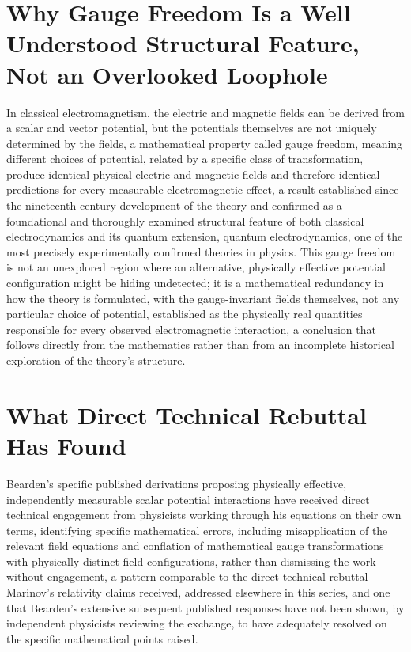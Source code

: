 \documentclass[11pt]{article}
\begin{document}
\section{Why Gauge Freedom Is a Well Understood Structural Feature, Not an Overlooked Loophole}

In classical electromagnetism, the electric and magnetic fields can be derived from a scalar and vector potential, but the potentials themselves are not uniquely determined by the fields, a mathematical property called gauge freedom, meaning different choices of potential, related by a specific class of transformation, produce identical physical electric and magnetic fields and therefore identical predictions for every measurable electromagnetic effect, a result established since the nineteenth century development of the theory and confirmed as a foundational and thoroughly examined structural feature of both classical electrodynamics and its quantum extension, quantum electrodynamics, one of the most precisely experimentally confirmed theories in physics. This gauge freedom is not an unexplored region where an alternative, physically effective potential configuration might be hiding undetected; it is a mathematical redundancy in how the theory is formulated, with the gauge-invariant fields themselves, not any particular choice of potential, established as the physically real quantities responsible for every observed electromagnetic interaction, a conclusion that follows directly from the mathematics rather than from an incomplete historical exploration of the theory's structure.

\section{What Direct Technical Rebuttal Has Found}

Bearden's specific published derivations proposing physically effective, independently measurable scalar potential interactions have received direct technical engagement from physicists working through his equations on their own terms, identifying specific mathematical errors, including misapplication of the relevant field equations and conflation of mathematical gauge transformations with physically distinct field configurations, rather than dismissing the work without engagement, a pattern comparable to the direct technical rebuttal Marinov's relativity claims received, addressed elsewhere in this series, and one that Bearden's extensive subsequent published responses have not been shown, by independent physicists reviewing the exchange, to have adequately resolved on the specific mathematical points raised.
\end{document}
